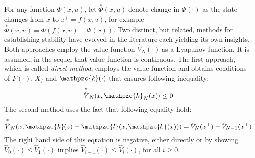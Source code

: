 For any function $\Phi(x,u)$, let $\overset{\ast}{\Phi}(x,u)$ denote change in $\Phi(\cdot)$ as the state changes from $x$ to $x^+=f(x,u)$, for example $\overset{\ast}{\Phi}(x,u)=\Phi(f(x,u)-\Phi(x))$. Two distinct, but related, methods for establishing stability have evolved in the literature each yielding its own insights. Both approaches employ the value function $\hat{V}_N(\cdot)$ as a Lyapunov function. It is assumed, in the sequel that value function is continuous. The first approach, which is called \textit{direct method}, employs the value function and obtains conditions of $F(\cdot)$, $X_f$ and $\mathpzc{k}(\cdot)$ that ensures following inequality:
\begin{equation}\label{eq:m31}
    \overset{\ast}{\hat{V}}_N(x,\mathpzc{k}_N(x)) \le 0
\end{equation}
\noindent The second method uses the fact that following equality hold:
\begin{equation}
    \overset{\ast}{\hat{V}}_N(x,\mathpzc{k}(z) + \mathpzc{l}(x,\mathpzc{k}(x)))=\hat{V}_N(x^+)-\hat{V}_{N-1}(x^+)
\end{equation}
\noindent The right hand side of this equation is negative, either directly or by showing $\hat{V}_0(\cdot) \le \hat{V}_1(\cdot)$ implies $\hat{V}_{i-1}(\cdot) \le \hat{V}_i(\cdot)$, for all $i \ge 0$.

